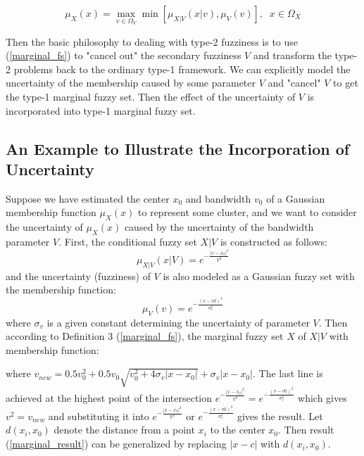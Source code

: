 \documentclass[journal]{IEEEtran}
\begin{document}
\begin{equation}
\label{marginal_fs}
\mu_X(x)=\max_{v\in\Omega_V}\min[\mu_{X|V}(x|v),\mu_V(v)],\;\;x\in\Omega_X
\end{equation}

Then the basic philosophy to dealing with type-2 fuzziness is to use (\ref{marginal_fs}) to "cancel out" the secondary fuzziness $V$ and transform the type-2 problems back to the ordinary type-1 framework. We can explicitly model the uncertainty of the membership caused by some parameter $V$ and "cancel" $V$ to get the type-1 marginal fuzzy set. Then the effect of the uncertainty of $V$ is incorporated into type-1 marginal fuzzy set. 
\subsection{An Example to Illustrate the Incorporation of Uncertainty}
\label{sec-3-2}
Suppose we have estimated the center $x_0$ and bandwidth $v_0$ of a Gaussian membership function $\mu_X(x)$ to represent some cluster, and we want to consider the uncertainty of $\mu_X(x)$ caused by the uncertainty of the bandwidth parameter $V$. First, the conditional fuzzy set $X|V$ is constructed as follows:
\begin{equation}
\mu_{X|V}(x|V)=e^{-\frac{|x-x_0|^2}{V^2}}
\end{equation}
and the uncertainty (fuzziness) of $V$ is also modeled as a Gaussian fuzzy set with the membership function:
\begin{equation}
\mu_V(v)=e^{-\frac{(v-v0)^2}{\sigma^2_v}}
\end{equation}
where $\sigma_v$ is a given constant determining the uncertainty of parameter $V$. Then according to Definition 3 (\ref{marginal_fs}), the marginal fuzzy set $X$ of $X|V$ with membership function:
\begin{IEEEeqnarray}{ll}
\label{marginal_result}
\mu_X(x)&=\max_{v\in R_+ }\min{} \nonumber \\
        &=e^{-
\end{IEEEeqnarray}
where $v_{new}=0.5v^2_0+0.5v_0\sqrt{v_0^2+4\sigma_v|x-x_0|}+\sigma_v|x-x_0|$. The last line is achieved at the highest point of the intersection $e^{-\frac{|x-x_0|^2}{V^2}}=e^{-\frac{(v-v0)^2}{\sigma^2_v}}$ which gives $v^2=v_{new}$ and substituting it into $e^{-\frac{|x-x_0|^2}{V^2}}$ or $e^{-\frac{(v-v0)^2}{\sigma^2_v}}$ gives the result. Let $d(x_i,x_0)$ denote the distance from a point $x_i$ to the center $x_0$. Then result (\ref{marginal_result}) can be generalized by replacing $|x-c|$ with $d(x_i,x_0)$.
\end{document}
